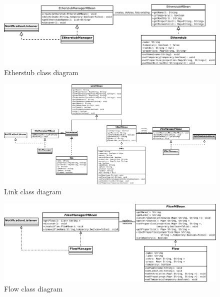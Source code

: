 \documentclass[11pt,openany]{book}
\begin{document}
        \begin{figure}[H]
          \centering
          \includegraphics[width=.8\textheight, angle=90]{img/impl/etherstub.pdf}

          \caption{Etherstub class diagram}
          \label{fig:impl:etherstub}
        \end{figure}

        \begin{figure}[H]
          \centering
          \includegraphics[width=.95\textheight, angle=90]{img/impl/link.pdf}

          \caption{Link class diagram}
          \label{fig:impl:vnic}
        \end{figure}

        \begin{figure}[H]
          \centering
          \includegraphics[width=.95\textheight, angle=90]{img/impl/flow.pdf}

          \caption{Flow class diagram}
          \label{fig:impl:flow}
        \end{figure}
\end{document}
